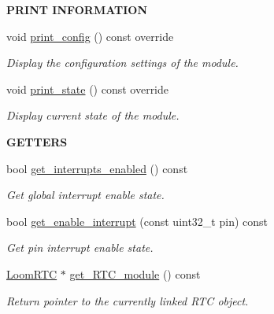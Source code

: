 \begin{Indent}{\bf P\+R\+I\+NT I\+N\+F\+O\+R\+M\+A\+T\+I\+ON}\par
\begin{DoxyCompactItemize}
\item 
void \hyperlink{class_loom___interrupt___manager_a6b7a28e4b7a150016e2975165581f7e9}{print\+\_\+config} () const override
\begin{DoxyCompactList}\small\item\em Display the configuration settings of the module. \end{DoxyCompactList}\item 
void \hyperlink{class_loom___interrupt___manager_ae9dde4f4da0e50a0bc19e2ae3453c3cb}{print\+\_\+state} () const override
\begin{DoxyCompactList}\small\item\em Display current state of the module. \end{DoxyCompactList}\end{DoxyCompactItemize}
\end{Indent}
\begin{Indent}{\bf G\+E\+T\+T\+E\+RS}\par
\begin{DoxyCompactItemize}
\item 
bool \hyperlink{class_loom___interrupt___manager_a647e6a07bcfcf479a5510d29f11fd1e6}{get\+\_\+interrupts\+\_\+enabled} () const 
\begin{DoxyCompactList}\small\item\em Get global interrupt enable state. \end{DoxyCompactList}\item 
bool \hyperlink{class_loom___interrupt___manager_a947b7bc935f50e33f2483ab315188709}{get\+\_\+enable\+\_\+interrupt} (const uint32\+\_\+t pin) const 
\begin{DoxyCompactList}\small\item\em Get pin interrupt enable state. \end{DoxyCompactList}\item 
\hyperlink{class_loom_r_t_c}{Loom\+R\+TC} $\ast$ \hyperlink{class_loom___interrupt___manager_a7d27c7a5b0c7f7d8c26f043656cb28a7}{get\+\_\+\+R\+T\+C\+\_\+module} () const 
\begin{DoxyCompactList}\small\item\em Return pointer to the currently linked R\+TC object. \end{DoxyCompactList}\end{DoxyCompactItemize}
\end{Indent}
